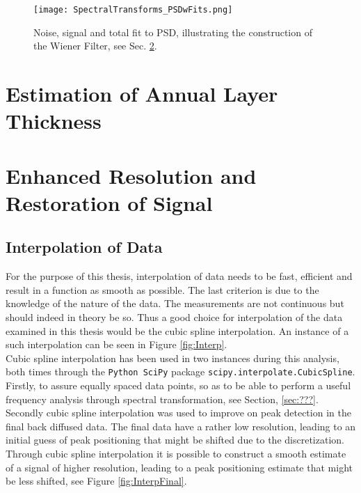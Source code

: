 \documentclass[../../CompleteThesis2/Complete_2ndDraft]{subfiles}
\begin{document}
\begin{figure}
	\centering
	\texttt{[image: SpectralTransforms\_PSDwFits.png]}
	\caption[FFT, DCT, NDCT PSDs with Fit, Site A]{Noise, signal and total fit to PSD, illustrating the construction of the Wiener Filter, see Sec. \ref{Sec:SignalAnalysis_Restoration}.}
	\label{fig:SpectralTransforms_PSDwFits}
\end{figure}



\section[Annual Layer Thickness][Annual Layer Thickness]{Estimation of Annual Layer Thickness}
\label{Sec:SignalAnalysis_AnnLayerThick}




\section[Restoration][Restoration]{Enhanced Resolution and Restoration of Signal}
\label{Sec:SignalAnalysis_Restoration}

\subsection[Interpolation]{Interpolation of Data}
\label{Subsec:SignalAnalysis_Restoration_Interpolation}
For the purpose of this thesis, interpolation of data needs to be fast, efficient and result in a function as smooth as possible. The last criterion is due to the knowledge of the nature of the data. The measurements are not continuous but should indeed in theory be so. Thus a good choice for interpolation of the data examined in this thesis would be the cubic spline interpolation. An instance of a such interpolation can be seen in Figure \ref{fig:Interp}.\\
Cubic spline interpolation has been used in two instances during this analysis, both times through the \lstinline[language=Python]|Python SciPy| package \lstinline[language=Python]|scipy.interpolate.CubicSpline|. Firstly, to assure equally spaced data points, so as to be able to perform a useful frequency analysis through spectral transformation, see Section, \ref{sec:???}. Secondly cubic spline interpolation was used to improve on peak detection in the final back diffused data. The final data have a rather low resolution, leading to an initial guess of peak positioning that might be shifted due to the discretization. Through cubic spline interpolation it is possible to construct a smooth estimate of a signal of higher resolution, leading to a peak positioning estimate that might be less shifted, see Figure \ref{fig:InterpFinal}.
\end{document}
